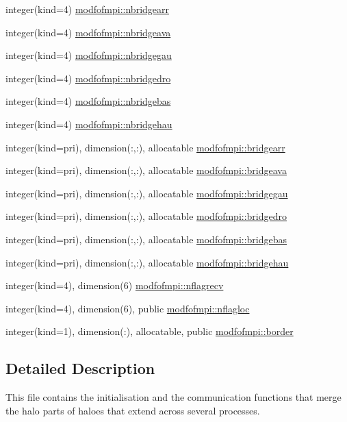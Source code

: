 \begin{DoxyCompactItemize}
integer(kind=4) \hyperlink{namespacemodfofmpi_a887d577430624ed6c6e8952b089e0576}{modfofmpi\+::nbridgearr}
\item 
integer(kind=4) \hyperlink{namespacemodfofmpi_a2ce30cec8604582ad8aaa26ef19b41cb}{modfofmpi\+::nbridgeava}
\item 
integer(kind=4) \hyperlink{namespacemodfofmpi_a000b4f4f0140c24648780b86d56698cf}{modfofmpi\+::nbridgegau}
\item 
integer(kind=4) \hyperlink{namespacemodfofmpi_a0253e42a34623e4816f27522252d1e29}{modfofmpi\+::nbridgedro}
\item 
integer(kind=4) \hyperlink{namespacemodfofmpi_ad71e96722537b8de69afdb8f68028e8b}{modfofmpi\+::nbridgebas}
\item 
integer(kind=4) \hyperlink{namespacemodfofmpi_a81ecc186519e9addf2dbf7ec92e32d23}{modfofmpi\+::nbridgehau}
\item 
integer(kind=pri), dimension(\+:,\+:), allocatable \hyperlink{namespacemodfofmpi_a3dffef2edd7b2899179cb3ffffd62430}{modfofmpi\+::bridgearr}
\item 
integer(kind=pri), dimension(\+:,\+:), allocatable \hyperlink{namespacemodfofmpi_a9891331c8f9f2ef3b5532b96129683ac}{modfofmpi\+::bridgeava}
\item 
integer(kind=pri), dimension(\+:,\+:), allocatable \hyperlink{namespacemodfofmpi_a157af8da53311980e23d05748e181a7f}{modfofmpi\+::bridgegau}
\item 
integer(kind=pri), dimension(\+:,\+:), allocatable \hyperlink{namespacemodfofmpi_a400402d1fc58970ecda00536a07c021c}{modfofmpi\+::bridgedro}
\item 
integer(kind=pri), dimension(\+:,\+:), allocatable \hyperlink{namespacemodfofmpi_a2bdd3864a996f2afb8e49bbcdbd120e5}{modfofmpi\+::bridgebas}
\item 
integer(kind=pri), dimension(\+:,\+:), allocatable \hyperlink{namespacemodfofmpi_a5a9577c42a1c3c53db8eb603945b530b}{modfofmpi\+::bridgehau}
\item 
integer(kind=4), dimension(6) \hyperlink{namespacemodfofmpi_aa8c0fc08baf8d208d7e2cddd0600ff99}{modfofmpi\+::nflagrecv}
\item 
integer(kind=4), dimension(6), public \hyperlink{namespacemodfofmpi_a9b2252c09a83a3f47fc6aec6462a68dc}{modfofmpi\+::nflagloc}
\item 
integer(kind=1), dimension(\+:), allocatable, public \hyperlink{namespacemodfofmpi_adb1afd2b26b96173f56ab37495e99e99}{modfofmpi\+::border}
\end{DoxyCompactItemize}


\subsection{Detailed Description}
This file contains the initialisation and the communication functions that merge the halo parts of haloes that extend across several processes. 

